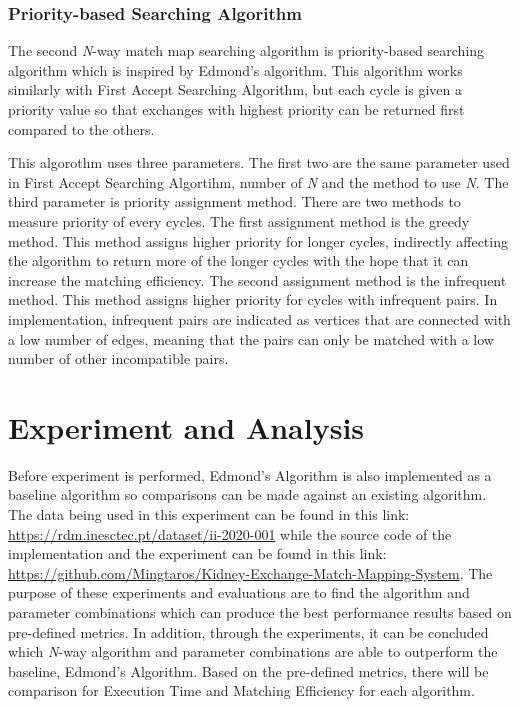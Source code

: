 \documentclass[conference]{IEEEtran}
\begin{document}
\subsubsection{Priority-based Searching Algorithm}
The second \textit{N}-way match map searching algorithm is priority-based searching algorithm which is inspired by Edmond's
algorithm. This algorithm works similarly with First Accept Searching Algorithm, but each cycle is given a priority value so
that exchanges with highest priority can be returned first compared to the others.

This algorothm uses three parameters. The first two are the same parameter used in First Accept Searching Algortihm, number of \textit{N}
and the method to use \textit{N}. The third parameter is priority assignment method. There are two methods to measure priority of every cycles.
The first assignment method is the greedy method. This method assigns higher priority for longer cycles, indirectly affecting the algorithm
to return more of the longer cycles with the hope that it can increase the matching efficiency.
The second assignment method is the infrequent method. This method assigns higher priority for cycles with infrequent pairs. In implementation,
infrequent pairs are indicated as vertices that are connected with a low number of edges, meaning that the pairs can only be matched with a low
number of other incompatible pairs.

\section{Experiment and Analysis}
Before experiment is performed, Edmond's Algorithm is also implemented as a baseline algorithm so comparisons can be made against
an existing algorithm. The data being used in this experiment can be found in this link: \url{https://rdm.inesctec.pt/dataset/ii-2020-001}
while the source code of the implementation and the experiment can be found in this link: \url{https://github.com/Mingtaros/Kidney-Exchange-Match-Mapping-System}.
The purpose of these experiments and evaluations are to find the algorithm and parameter combinations which can produce the best
performance results based on pre-defined metrics. In addition, through the experiments, it can be concluded which \textit{N}-way
algorithm and parameter combinations are able to outperform the baseline, Edmond's Algorithm. Based on the pre-defined metrics,
there will be comparison for Execution Time and Matching Efficiency for each algorithm.
\end{document}
